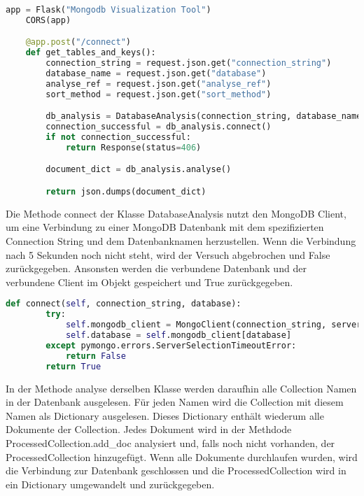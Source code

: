 \begin{lstlisting}[language=python, caption={app.py},label={lst:backend_app}]
    app = Flask("Mongodb Visualization Tool")
    CORS(app)

    @app.post("/connect")
    def get_tables_and_keys():
        connection_string = request.json.get("connection_string")
        database_name = request.json.get("database")
        analyse_ref = request.json.get("analyse_ref")
        sort_method = request.json.get("sort_method")

        db_analysis = DatabaseAnalysis(connection_string, database_name, analyse_ref, sort_method)
        connection_successful = db_analysis.connect()
        if not connection_successful:
            return Response(status=406)

        document_dict = db_analysis.analyse()

        return json.dumps(document_dict)
\end{lstlisting}

Die Methode connect der Klasse DatabaseAnalysis nutzt  den MongoDB Client, um eine Verbindung zu einer MongoDB Datenbank mit dem spezifizierten Connection String und dem Datenbanknamen herzustellen.
Wenn die Verbindung nach 5 Sekunden noch nicht steht, wird der Versuch abgebrochen und False zurückgegeben.
Ansonsten werden die verbundene Datenbank und der verbundene Client im Objekt gespeichert und True zurückgegeben.

\begin{lstlisting}[language=python, caption={DatabaseAnalysis.connect},label={lst:backend_connect}]
    def connect(self, connection_string, database):
        try:
            self.mongodb_client = MongoClient(connection_string, serverSelectionTimeoutMS=5000)
            self.database = self.mongodb_client[database]
        except pymongo.errors.ServerSelectionTimeoutError:
            return False
        return True
\end{lstlisting}

In der Methode analyse derselben Klasse werden daraufhin alle Collection Namen in der Datenbank ausgelesen.
Für jeden Namen wird die Collection mit diesem Namen als Dictionary ausgelesen.
Dieses Dictionary enthält wiederum alle Dokumente der Collection.
Jedes Dokument wird in der Methdode ProcessedCollection.add\_doc analysiert und, falls noch nicht vorhanden, der ProcessedCollection hinzugefügt.
Wenn alle Dokumente durchlaufen wurden, wird die Verbindung zur Datenbank geschlossen und die ProcessedCollection wird in ein Dictionary umgewandelt und zurückgegeben.

